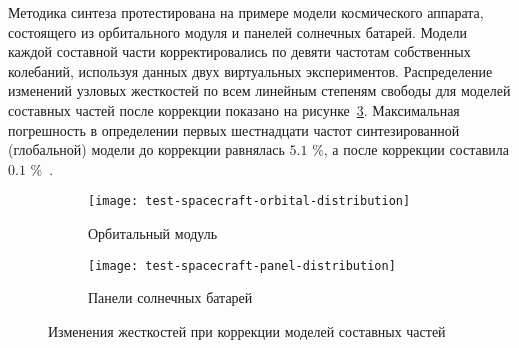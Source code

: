 Методика синтеза протестирована на примере модели космического аппарата, состоящего из орбитального модуля и панелей солнечных батарей. Модели каждой составной части корректировались по девяти частотам собственных колебаний, используя данных двух виртуальных экспериментов. Распределение изменений узловых жесткостей по всем линейным степеням свободы для моделей составных частей после коррекции показано на рисунке~\ref{fig:test-spacecraft-distribution}. Максимальная погрешность в определении первых шестнадцати частот синтезированной (глобальной) модели до коррекции равнялась $ 5.1 $ \%, а после коррекции составила $ 0.1 $ \%~. 

\begin{figure}[H]
	\centering
	\begin{subfigure}[t]{0.44\textwidth}
		\centering
		\texttt{[image: test-spacecraft-orbital-distribution]}
		\caption{Орбитальный модуль} \label{subfig:test-orbital-distribution}
	\end{subfigure}
	\hfill
	\begin{subfigure}[t]{0.42\textwidth}
		\centering
		\texttt{[image: test-spacecraft-panel-distribution]}
		\caption{Панели солнечных батарей} \label{subfig:test-panel-distribution}
	\end{subfigure}
	\vspace{1em}
	\caption{Изменения жесткостей при коррекции моделей составных частей} \label{fig:test-spacecraft-distribution} 
\end{figure}

